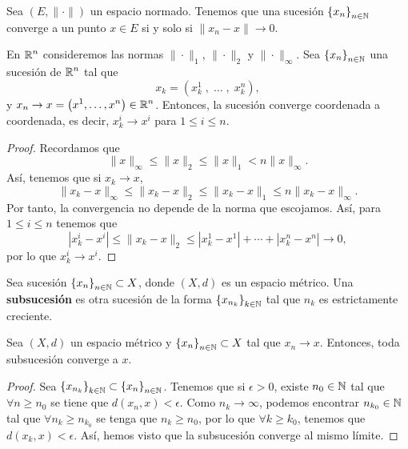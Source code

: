 \begin{observation}
	Sea $\displaystyle \left(E, \| \cdot \| \right) $ un espacio normado. Tenemos que una sucesión $\displaystyle \left\{ x_{n}\right\} _{n\in\mathbb{N}} $ converge a un punto $\displaystyle x \in E $ si y solo si $\displaystyle \| x_{n} - x \| \to 0 $.
\end{observation}
\begin{prop}
	En $\displaystyle \mathbb{R}^{n} $ consideremos las normas $\displaystyle \| \cdot \| _{1} $, $\displaystyle \| \cdot \|_{2} $ y $\displaystyle \| \cdot \|_{\infty} $. Sea $\displaystyle \left\{ x_{n}\right\} _{n\in\mathbb{N}} $ una sucesión de $\displaystyle \mathbb{R}^{n} $ tal que 
	\[x_{k} = \left(x_{k}^{1} \; , \; \ldots \;, \;  x^{n}_{k}\right) ,\]
	y $\displaystyle x_{n} \to x = \left(x^{1}, \ldots, x^{n}\right)\in \mathbb{R}^{n}$. Entonces, la sucesión converge coordenada a coordenada, es decir, $\displaystyle x_{k}^{i} \to x^{i} $ para $\displaystyle 1 \leq i \leq n $.
\end{prop}
\begin{proof}
Recordamos que
\[\| x \|_{\infty} \leq \| x \| _{2} \leq \| x \|_{1} < n\|x\|_{\infty} .\]
Así, tenemos que si $\displaystyle x_{k} \to x $,
\[ \|x_{k}-x\|_{\infty} \leq \|x_{k}-x\|_{2} \leq \|x_{k}-x\|_{1} \leq n\|x_{k}-x\|_{\infty} .\]
Por tanto, la convergencia no depende de la norma que escojamos. Así, para $\displaystyle 1 \leq i \leq n $ tenemos que
\[ \left|x_{k}^{i}-x^{i}\right| \leq \|x_{k}-x\|_{2} \leq \left|x_{k}^{1}-x^{1}\right|+\cdots + \left|x_{k}^{n}-x^{n}\right| \to 0 ,\]
por lo que $\displaystyle x_{k}^{i} \to x^{i} $.
\end{proof}
\begin{definition}[Subsucesión]
	Sea sucesión $\displaystyle \left\{ x_{n}\right\} _{n\in\mathbb{N}} \subset X $, donde $\displaystyle \left(X,d\right) $ es un espacio métrico. Una \textbf{subsucesión} es otra sucesión de la forma $\displaystyle \left\{ x_{n_{k}}\right\} _{k \in \mathbb{N}} $ tal que $\displaystyle n_{k} $ es estrictamente creciente.
\end{definition}
\begin{prop}
	Sea $\displaystyle \left(X,d\right) $ un espacio métrico y $\displaystyle \left\{ x_{n}\right\} _{n\in\mathbb{N}}\subset X $ tal que $\displaystyle x_{n} \to x $. Entonces, toda subsucesión converge a $\displaystyle x $.
\end{prop}
\begin{proof}
	Sea $\displaystyle \left\{ x_{n_{k}}\right\} _{k\in\mathbb{N}} \subset \left\{ x_{n}\right\} _{n\in\mathbb{N}}$. Tenemos que si $\displaystyle \epsilon > 0 $, existe $\displaystyle n_{0} \in \mathbb{N} $ tal que $\displaystyle \forall n \geq n_{0} $ se tiene que $\displaystyle d\left(x_{n}, x\right) < \epsilon  $. Como $\displaystyle n_{k} \to \infty $, podemos encontrar $\displaystyle n_{k_{0}} \in \mathbb{N} $ tal que $\displaystyle \forall n_{k} \geq n_{k_{0}} $ se tenga que $\displaystyle n_{k} \geq n_{0} $, por lo que $\displaystyle \forall k \geq k_{0} $, tenemos que $\displaystyle d\left(x_{k}, x\right) < \epsilon $.
	Así, hemos visto que la subsucesión converge al mismo límite.
\end{proof}
